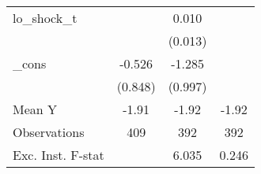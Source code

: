 {\begin{tabular}{l*{3}{c}}
\addlinespace
lo\_shock\_t  &                     &       0.010         &                     \\
            &                     &     (0.013)         &                     \\
\addlinespace
\_cons      &      -0.526         &      -1.285         &                     \\
            &     (0.848)         &     (0.997)         &                     \\
\midrule
Mean Y      &       -1.91         &       -1.92         &       -1.92         \\
Observations&         409         &         392         &         392         \\
Exc. Inst. F-stat&                     &       6.035         &       0.246         \\
\bottomrule
\end{tabular}
}
